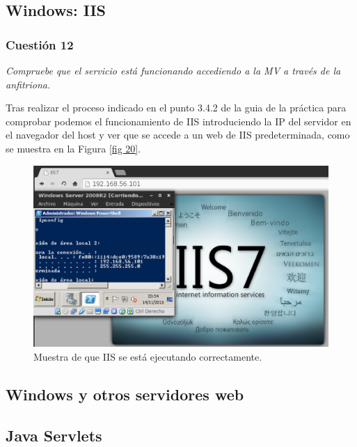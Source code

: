 \subsection{Windows: IIS}
\subsubsection{Cuestión 12}
\textit{Compruebe que el servicio está funcionando accediendo a la MV a través de la anfitriona.}
\newline

Tras realizar el proceso indicado en el punto 3.4.2 de la guia de la práctica para comprobar podemos  el funcionamiento de IIS introduciendo la IP del servidor en el navegador del host y ver que se accede a un web de IIS predeterminada, como se muestra en la Figura \ref{fig 20}.

\begin{figure}[H]
    \begin{center}
        \includegraphics[scale=0.5]{imagenes/img20.eps}
        \caption{Muestra de que IIS se está ejecutando correctamente.}
        \label{fig20}
    \end{center}
\end{figure}

\subsection{Windows y otros servidores web}

\subsection{Java Servlets}
